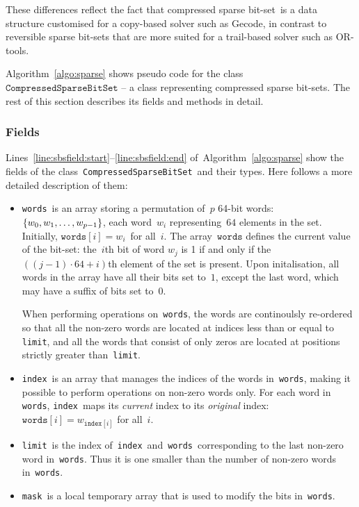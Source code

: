 \documentclass[a4paper,11pt]{article}
\newcommand{\Algoref}[1]{Algorithm~\ref{#1}}
\newcommand{\Linesref}[2]{Lines~\ref{#1}--\ref{#2}}
\newcommand{\Words}{\texttt{words}}
\newcommand{\Index}{\texttt{index}}
\newcommand{\Mask}{\texttt{mask}}
\newcommand{\Limit}{\texttt{limit}}
\newcommand{\SparseBitSet}{\texttt{CompressedSparseBitSet}}
\newcommand{\bitset}[0]{compressed sparse bit-set}
\numberwithin{equation}{section}
\begin{document}
These differences reflect the fact that \bitset~is a data structure customised
for a copy-based solver such as Gecode, in contrast to reversible sparse bit-sets
that are more suited for a trail-based solver such as OR-tools.

\Algoref{algo:sparse} shows pseudo code for the class~$\SparseBitSet$ -- a class
representing {\bitset}s.
The rest of this section describes its fields and methods in detail.

\begin{algorithm}[H]
  \begin{algorithmic}[1]  %
    
    \end{algorithmic}
  \caption{Pseudo code for the class \SparseBitSet.}
  \label{algo:sparse}
\end{algorithm}

\subsubsection{Fields}
\label{sbs:fields}

\Linesref{line:sbsfield:start}{line:sbsfield:end} of~\Algoref{algo:sparse} show the fields
of the class~\SparseBitSet~and their types. Here follows a more detailed description of them:

\begin{itemize}
  \item \Words~is an array storing a permutation of~$p$ 64-bit 
    words:~$\left\{w_0, w_1, \dots, w_{p-1}\right\}$, each word~$w_i$ 
    representing~$64$ elements in the set.
    Initially, $\Words[i] = w_i$~for all~$i$.
    The array~$\Words$ defines the current
    value of the bit-set:
    the~$i$th bit of word $w_j$ is 1 if and only if 
    the~$\left((j-1) \cdot 64 + i\right)$th element of
    the set is present. 
    Upon initalisation, all words in the array 
    have all their bits set to~$1$,
    except the last word, which may have a suffix of bits set to~$0$. 
    
    When performing operations on~\Words, the words are continoulsly re-ordered
    so that all the non-zero words are
    located at indices less than or equal to \Limit, and all the words that
    consist of only zeros are located at positions strictly greater than~\Limit.

  \item \Index~is an array that manages the indices of the words in~\Words,
    making it possible to perform operations on non-zero words only.
    For each word in \Words, \Index~maps its \emph{current} index to its
    \emph{original} index:~$\Words[i] = w_{\Index[i]}$ for all~$i$.
    
  \item \Limit~is the index of~\Index~and~\Words~corresponding
    to the last non-zero word in~\Words.
    Thus it is one smaller than the number of non-zero words in~\Words.

  \item \Mask~is a local temporary array that is used to modify the bits in~\Words.

\end{itemize}
\end{document}
